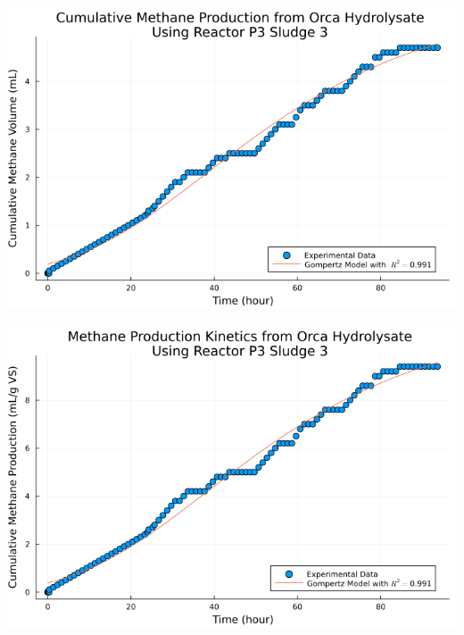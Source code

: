 \documentclass[11pt]{article}
\begin{document}
\begin{center}
\includegraphics[width=.9\linewidth]{../plots/BMPs/Orca Hydrolysate/methane_kinetics_orca_p3_s3_hour.png}
\end{center}

\begin{center}
\includegraphics[width=.9\linewidth]{../plots/BMPs/Orca Hydrolysate/specific_methane_kinetics_orca_p3_s3_hour.png}
\end{center}
\end{document}
